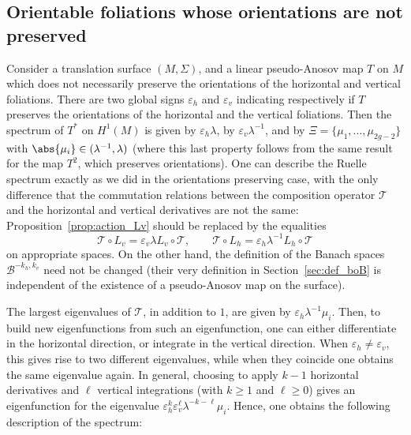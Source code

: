 \documentclass[JEP,XML,SOM,Unicode]{cedram}
\newcommand{\boB}{\mathcal{B}}
\newcommand{\boT}{\mathcal{T}}
\let\epsilon\varepsilon
\theoremstyle{definition}
\numberwithin{equation}{section}
\begin{document}
\subsection{Orientable foliations whose orientations are not preserved}
\label{subsec:orientable_foliations}

Consider a translation surface $(M,\Sigma)$, and a linear pseudo-Anosov map
$T$ on $M$ which does not necessarily preserve the orientations of the
horizontal and vertical foliations. There are two global signs $\epsilon_h$
and $\epsilon_v$ indicating respectively if $T$ preserves the orientations of
the horizontal and the vertical foliations. Then the spectrum of $T^*$ on
$H^1(M)$ is given by $\epsilon_h \lambda$, by $\epsilon_v \lambda^{-1}$, and
by $\Xi = \{\mu_1,\dotsc, \mu_{2g-2}\}$ with $\abs{\mu_i} \in (\lambda^{-1},
\lambda)$ (where this last property follows from the same result for the map
$T^2$, which preserves orientations). One can describe the Ruelle spectrum
exactly as we did in the orientations preserving case, with the only
difference that the commutation relations between the composition operator
$\boT$ and the horizontal and vertical derivatives are not the same:
Proposition~\ref{prop:action_Lv} should be replaced by the equalities
\begin{equation*}
\boT \circ L_v = \epsilon_v \lambda L_v \circ \boT,
\qquad
\boT \circ L_h = \epsilon_h \lambda^{-1} L_h \circ \boT
\end{equation*}
on appropriate spaces. On the other hand, the definition of the Banach spaces
$\boB^{-k_h, k_v}$ need not be changed (their very definition in
Section~\ref{sec:def_boB} is independent of the existence of a pseudo-Anosov
map on the surface).

The largest eigenvalues of $\boT$, in addition to $1$, are given by
$\epsilon_h \lambda^{-1} \mu_i$. Then, to build new eigenfunctions from such
an eigenfunction, one can either differentiate in the horizontal direction,
or integrate in the vertical direction. When $\epsilon_h \neq \epsilon_v$,
this gives rise to two different eigenvalues, while when they coincide one
obtains the same eigenvalue again. In general, choosing to apply $k-1$
horizontal derivatives and $\ell$ vertical integrations (with $k \geq 1$ and
$\ell \geq 0$) gives an eigenfunction for the eigenvalue $\epsilon_h^k
\epsilon_v^\ell \lambda^{-k-\ell}\mu_i$. Hence, one obtains the following
description of the spectrum:
\end{document}
